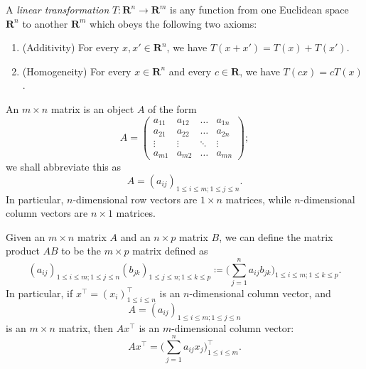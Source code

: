 \begin{definition}\label{6.1.6}
    A \emph{linear transformation} \(T : \mathbf{R}^n \to \mathbf{R}^m\) is any function from one Euclidean space \(\mathbf{R}^n\) to another \(\mathbf{R}^m\) which obeys the following two axioms:
    \begin{enumerate}
        \item (Additivity)
              For every \(x, x' \in \mathbf{R}^n\), we have \(T(x + x') = T(x) + T(x')\).
        \item (Homogeneity)
              For every \(x \in \mathbf{R}^n\) and every \(c \in \mathbf{R}\), we have \(T(cx) = cT(x)\).
    \end{enumerate}
\end{definition}

\setcounter{theorem}{9}
\begin{definition}[Matrices]\label{6.1.10}
    An \(m \times n\) matrix is an object \(A\) of the form
    \[
        A = \begin{pmatrix}
            a_{11} & a_{12} & \dots  & a_{1n} \\
            a_{21} & a_{22} & \dots  & a_{2n} \\
            \vdots & \vdots & \ddots & \vdots \\
            a_{m1} & a_{m2} & \dots  & a_{mn}
        \end{pmatrix};
    \]
    we shall abbreviate this as
    \[
        A = (a_{ij})_{1 \leq i \leq m ; 1 \leq j \leq n}.
    \]
    In particular, \(n\)-dimensional row vectors are \(1 \times n\) matrices, while \(n\)-dimensional column vectors are \(n \times 1\) matrices.
\end{definition}

\begin{definition}\label{6.1.11}
    Given an \(m \times n\) matrix \(A\) and an \(n \times p\) matrix \(B\), we can define the matrix product \(AB\) to be the \(m \times p\) matrix defined as
    \[
        (a_{ij})_{1 \leq i \leq m ; 1 \leq j \leq n} (b_{jk})_{1 \leq j \leq n ; 1 \leq k \leq p} \coloneqq \bigg(\sum_{j = 1}^n a_{ij} b_{jk}\bigg)_{1 \leq i \leq m ; 1 \leq k \leq p}.
    \]
    In particular, if \(x^\top = (x_i)_{1 \leq i \leq n}^\top\) is an \(n\)-dimensional column vector, and
    \[
        A = (a_{ij})_{1 \leq i \leq m ; 1 \leq j \leq n}
    \]
    is an \(m \times n\) matrix, then \(A x^\top\) is an \(m\)-dimensional column vector:
    \[
        A x^\top = \bigg(\sum_{j = 1}^n a_{ij} x_j\bigg)_{1 \leq i \leq m}^\top.
    \]
\end{definition}

